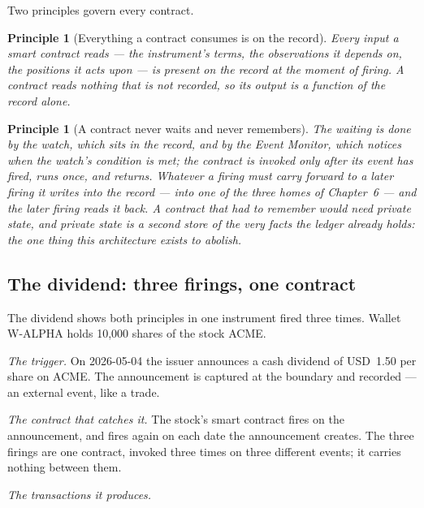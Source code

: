 \documentclass[11pt,a4paper]{article}
\newcommand{\USD}[1]{\mbox{USD~#1}}
\newtheorem{principle}[definition]{Principle}
\begin{document}
Two principles govern every contract.

\begin{principle}[Everything a contract consumes is on the record]
Every input a smart contract reads --- the instrument's terms, the observations
it depends on, the positions it acts upon --- is present on the record at the
moment of firing. A contract reads nothing that is not recorded, so its output
is a function of the record alone.
\end{principle}

\begin{principle}[A contract never waits and never remembers]
The waiting is done by the watch, which sits in the record, and by the Event
Monitor, which notices when the watch's condition is met; the contract is
invoked only after its event has fired, runs once, and returns. Whatever a
firing must carry forward to a later firing it writes into the record --- into
one of the three homes of Chapter~6 --- and the later firing reads it back. A
contract that had to remember would need private state, and private state is a
second store of the very facts the ledger already holds: the one thing this
architecture exists to abolish.
\end{principle}

\subsection{The dividend: three firings, one contract}

The dividend shows both principles in one instrument fired three times. Wallet
W-ALPHA holds 10{,}000 shares of the stock ACME.

\emph{The trigger.} On 2026-05-04 the issuer announces a cash dividend of
\USD{1.50} per share on ACME. The announcement is captured at the boundary and
recorded --- an external event, like a trade.

\emph{The contract that catches it.} The stock's smart contract fires on the
announcement, and fires again on each date the announcement creates. The three
firings are one contract, invoked three times on three different events; it
carries nothing between them.

\emph{The transactions it produces.}
\end{document}
